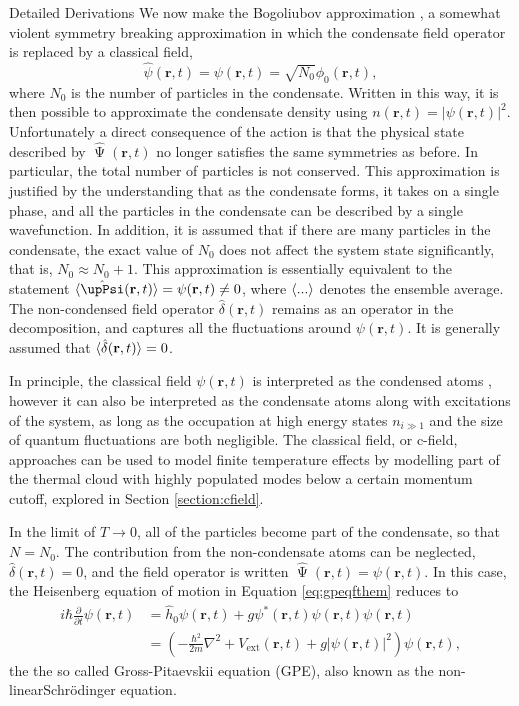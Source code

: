 \begin{chapter}{Detailed Derivations\label{app:App2}}
We now make the Bogoliubov approximation \cite{bogo47}, a somewhat violent symmetry breaking approximation in which the condensate field operator is replaced by a classical field, 
\begin{equation*}
\hat{\psi}(\mathbf{r},t) = \psi(\mathbf{r},t) = \sqrt{N_0}\phi_0(\mathbf{r},t),
\end{equation*}
where $N_0$ is the number of particles in the condensate. Written in this way, it is then possible to approximate the condensate density using $n(\mathbf{r},t) = |\psi(\mathbf{r},t)|^2$. Unfortunately a direct consequence of the action is that the physical state described by $\hat{\upPsi}(\mathbf{r},t)$ no longer satisfies the same symmetries as before. In particular, the total number of particles is not conserved. This approximation is justified by the understanding that as the condensate forms, it takes on a single phase, and all the particles in the condensate can be described by a single wavefunction. In addition, it is assumed that if there are many particles in the condensate, the exact value of $N_0$ does not affect the system state significantly, that is, $N_0 \approx N_0+1$. This approximation is essentially equivalent to the statement $\braket{\hat{\upPsi}(\mathbf{r},t)} = \psi(\mathbf{r},t) \ne 0$, where $\braket{...}$ denotes the ensemble average. The non-condensed field operator $\hat{\delta}(\mathbf{r},t)$ remains as an operator in the decomposition, and captures all the fluctuations around $\psi(\mathbf{r},t)$. It is generally assumed that $\braket{\hat{\delta}(\mathbf{r},t)}=0$.

In principle, the classical field $\psi(\mathbf{r},t)$ is interpreted as the condensed atoms , however it can also be interpreted as the condensate atoms along with excitations of the system, as long as the occupation at high energy states $n_{i\gg1}$ and the size of quantum fluctuations are both negligible. The classical field, or c-field, approaches can be used to model finite temperature effects by modelling part of the thermal cloud with highly populated modes below a certain momentum cutoff, explored in Section \ref{section:cfield}.

In the limit of $T\rightarrow0$, all of the particles become part of the condensate, so that $N=N_0$. The contribution from the non-condensate atoms can be neglected, $\hat{\delta}(\mathbf{r},t)=0$, and the field operator is written $\hat{\upPsi}(\mathbf{r},t) = \psi(\mathbf{r},t)$. In this case, the Heisenberg equation of motion in Equation \ref{eq:gpeqfthem} reduces to
\begin{equation*}
\begin{split}
i \hbar\frac{\partial}{\partial t}\psi(\mathbf{r},t) &= \hat{h}_0\psi(\mathbf{r},t) + g\psi^*(\mathbf{r},t)\psi(\mathbf{r},t)\psi(\mathbf{r},t)\\
&= \left ( -\frac{\hbar^2}{2m}\nabla^2+V_{\mathrm{ext}}(\mathbf{r},t) + g|\psi(\mathbf{r},t)|^2 \right ) \psi(\mathbf{r},t),
\end{split}
\end{equation*}
the the so called Gross-Pitaevskii equation (GPE), also known as the non-linear\;Schr\"odinger equation.


\end{chapter}
